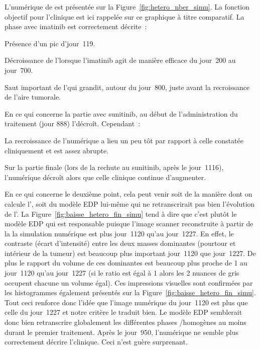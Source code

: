 \documentclass[main.tex]{subfiles}
\begin{document}
L'\hetero numérique de \Nber est présentée sur la Figure~\ref{fig:hetero_nber_simu}. 
La fonction objectif pour l'\hetero clinique %
est ici rappelée sur ce graphique à titre comparatif. La phase avec imatinib est  correctement décrite~:
\begin{myitemize}
\item Présence d'un pic d'\hetero jour~119.
\item Décroissance de l'\hetero lorsque l'imatinib agit de manière efficace du jour~200 au jour~700.
\item Saut important de l'\hetero qui grandit, autour du jour~800, juste avant la recroissance de l'aire tumorale.
\end{myitemize}
En ce qui concerne la partie avec sunitinib, au début de l'administration du traitement (jour 888) l'\hetero décroît. Cependant~:
\begin{myitemize}
\item La recroissance de l'\hetero numérique a lieu un peu tôt par rapport à celle constatée cliniquement et est assez abrupte.
\item Sur la partie finale (lors de la rechute au sunitinib, après le jour~1116), l'\hetero numérique décroît alors que celle clinique continue d'augmenter. 
\end{myitemize}
En ce qui concerne le deuxième point, cela peut venir soit de la manière dont on calcule l'\hetero, soit du modèle EDP lui-même qui ne retranscrirait pas bien l'évolution de l'\hetero. La Figure~\ref{fig:baisse_hetero_fin_simu} tend à dire que c'est plutôt le modèle EDP qui est responsable puisque l'image scanner reconstruite à partir de la la simulation numérique est 
plus \heterogene jour~1120 qu'au jour~1227. 
En effet, le contraste (écart d'intensité) entre les deux masses dominantes (pourtour et intérieur de la tumeur) 
est beaucoup plus important jour~1120 que jour~1227. De plus le rapport du volume de ces dominantes est beaucoup plus proche de 1 au jour~1120 qu'au jour~1227 (si le ratio est égal à 1 alors les 2 nuances de gris occupent chacune un volume égal). Ces impressions visuelles sont confirmées par les histogrammes également présentés sur la Figure~\ref{fig:baisse_hetero_fin_simu}. 
Tout ceci renforce donc l'idée que l'image numérique du jour~1120 est plus \heterogene que celle du jour~1227 et notre critère le traduit bien. Le modèle EDP semblerait donc bien retranscrire globalement les différentes phases  \heterogenes /homogènes au moins durant le premier traitement. Après le jour~950, l'\hetero numérique ne semble plus correctement  décrire l'\hetero clinique. Ceci n'est guère surprenant. %
\end{document}
